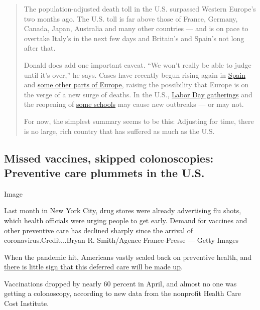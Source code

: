 \begin{quote}
The population-adjusted death toll in the U.S. surpassed Western
Europe's two months ago. The U.S. toll is far above those of France,
Germany, Canada, Japan, Australia and many other countries --- and is on
pace to overtake Italy's in the next few days and Britain's and Spain's
not long after that.

Donald does add one important caveat. ``We won't really be able to judge
until it's over,'' he says. Cases have recently begun rising again in
\href{https://www.nytimes3xbfgragh.onion/2020/08/25/briefing/republican-convention-wisconsin-jerry-falwell-your-tuesday-briefing.html}{Spain}
and
\href{https://www.nytimes3xbfgragh.onion/2020/08/21/world/europe/coronavirus-second-wave.html}{some
other parts of Europe}, raising the possibility that Europe is on the
verge of a new surge of deaths. In the U.S.,
\href{https://www.cnn.com/2020/09/06/health/us-coronavirus-sunday/index.html}{Labor
Day gatherings} and the reopening of
\href{https://www.nytimes3xbfgragh.onion/interactive/2020/us/covid-college-cases-tracker.html}{some
schools} may cause new outbreaks --- or may not.

For now, the simplest summary seems to be this: Adjusting for time,
there is no large, rich country that has suffered as much as the U.S.
\end{quote}

\hypertarget{missed-vaccines-skipped-colonoscopies-preventive-care-plummets-in-the-us}{%
\subsection{Missed vaccines, skipped colonoscopies: Preventive care
plummets in the
U.S.}\label{missed-vaccines-skipped-colonoscopies-preventive-care-plummets-in-the-us}}

Image

Last month in New York City, drug stores were already advertising flu
shots, which health officials were urging people to get early. Demand
for vaccines and other preventive care has declined sharply since the
arrival of coronavirus.Credit...Bryan R. Smith/Agence France-Presse ---
Getty Images

When the pandemic hit, Americans vastly scaled back on preventive
health, and
\href{https://www.nytimes3xbfgragh.onion/2020/09/11/upshot/pandemic-decline-preventive-care.html}{there
is little sign that this deferred care will be made up}.

Vaccinations dropped by nearly 60 percent in April, and almost no one
was getting a colonoscopy, according to new data from the nonprofit
Health Care Cost Institute.

